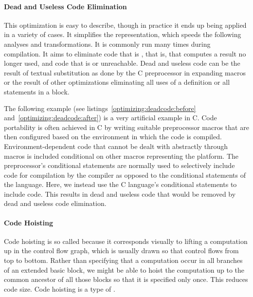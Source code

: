 

\paragraph{Dead and Useless Code Elimination}
This optimization is easy to describe, though in practice it ends up being applied in a variety of cases. It simplifies the representation, which speeds the following analyses and transformations. It is commonly run many times during compilation. It aims to eliminate code that is , that is, that computes a result no longer used, and code that is  or unreachable. Dead and useless code can be the result of textual substitution as done by the C preprocessor in expanding macros or the result of other optimizations eliminating all uses of a definition or all statements in a block.

The following example (see listings~\ref{optimizing:deadcode:before} and~\ref{optimizing:deadcode:after}) is a very artificial example in C. Code portability is often achieved in C by writing suitable preprocessor macros that are then configured based on the environment in which the code is compiled. Environment-dependent code that cannot be dealt with abstractly through macros is included conditional on other macros representing the platform. The preprocessor's conditional statements are normally used to selectively include code for compilation by the compiler as opposed to the conditional statements of the language. Here, we instead use the C language's conditional statements to include code. This results in dead and useless code that would be removed by dead and useless code elimination.





\paragraph{Code Hoisting}
Code hoisting is so called because it corresponds visually to lifting a computation up in the control flow graph, which is usually drawn so that control flows from top to bottom. Rather than specifying that a computation occur in all branches of an extended basic block, we might be able to hoist the computation up to the common ancestor of all those blocks so that it is specified only once. This reduces code size. Code hoisting is a type of .

